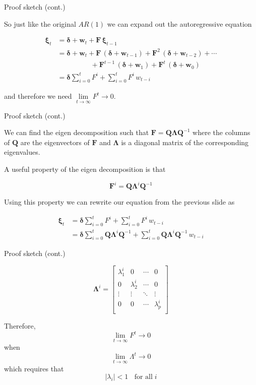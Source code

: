\documentclass[11pt,ignorenonframetext,]{beamer}
\begin{document}
\begin{frame}[t]{Proof sketch (cont.)}

So just like the original \(AR(1)\) we can expand out the autoregressive
equation

\[
\begin{aligned}
\bm\xi_t 
  &= \bm{\delta} + \bm w_t + \bm{F} \, \bm\xi_{t-1}  \\
  &= \bm{\delta} + \bm w_t + \bm{F} \, (\bm\delta+\bm w_{t-1}) + \bm{F}^2 \, (\bm \delta+\bm w_{t-2}) + \cdots \\
  &\qquad\qquad~\,\,\,                        + \bm{F}^{t-1} \, (\bm \delta+\bm w_{1}) + \bm{F}^t \, (\bm \delta+\bm w_0) \\
  &= \bm{\delta} \sum_{i=0}^t F^i + \sum_{i=0}^t F^i \, w_{t-i}
\end{aligned}
\]

and therefore we need \(\underset{t\to\infty}{\lim} F^t \to 0\).

\end{frame}

\begin{frame}[t]{Proof sketch (cont.)}

We can find the eigen decomposition such that
\(\bm F = \bm Q \bm \Lambda \bm Q^{-1}\) where the columns of \(\bm Q\)
are the eigenvectors of \(\bm F\) and \(\bm \Lambda\) is a diagonal
matrix of the corresponding eigenvalues.

A useful property of the eigen decomposition is that

\[ \bm{F}^i = \bm Q \bm \Lambda^i \bm Q^{-1} \]

\pause

Using this property we can rewrite our equation from the previous slide
as

\[
\begin{aligned}
\bm\xi_t 
  &= \bm{\delta} \sum_{i=0}^t F^i + \sum_{i=0}^t F^i \, w_{t-i} \\
  &= \bm{\delta} \sum_{i=0}^t \bm Q \bm \Lambda^i \bm Q^{-1} + \sum_{i=0}^t \bm Q \bm \Lambda^i \bm Q^{-1} \, w_{t-i}
\end{aligned}
\]

\end{frame}

\begin{frame}[t]{Proof sketch (cont.)}

\[
\bm \Lambda^i = \begin{bmatrix}
\lambda_1^i & 0 & \cdots & 0 \\
0 & \lambda_2^i & \cdots & 0 \\
\vdots & \vdots & \ddots & \vdots \\
0 & 0 & \cdots & \lambda_p^i \\
\end{bmatrix}
\]

Therefore, \[\underset{t\to\infty}{\lim} F^t \to 0\] when
\[\underset{t\to\infty}{\lim} \Lambda^t \to 0\] which requires that
\[|\lambda_i| < 1 \;\; \text{ for all} \; i\]

\end{frame}
\end{document}
